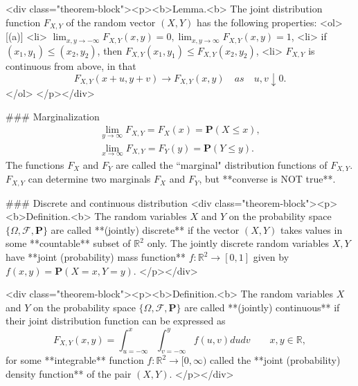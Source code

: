 <div class="theorem-block"><p><b>Lemma.<b> 
The joint distribution function $F_{X, Y}$ of the random vector $(X, Y)$ has the following properties: 
<ol>[(a)]
    <li> $\lim_{x, y\to -\infty} F_{X, Y}(x, y) = 0, \lim_{x,y\to\infty} F_{X, Y}(x,y) = 1$,
    <li> if $(x_1, y_1) \leq (x_2, y_2)$, then $F_{X,Y}(x_1, y_1) \leq F_{X, Y}(x_2, y_2)$,
    <li> $F_{X,Y}$ is continuous from above, in that 
    $$\begin{equation}
        F_{X,Y}(x+u, y+v) \to F_{X,Y}(x,y) \quad as \quad u, v \downarrow 0.
    \end{equation}$$
</ol>
</p></div>

### Marginalization 
\begin{gather*}
    \lim_{y\to\infty} F_{X,Y} = F_X(x) = \mathbf{P}(X \leq x), \\
    \lim_{x\to\infty} F_{X,Y} = F_Y(y) = \mathbf{P}(Y \leq y).
\end{gather*}
The functions $F_X$ and $F_Y$ are called the ``marginal" distribution functions of $F_{X,Y}$. $F_{X,Y}$ can determine two marginals $F_X$ and $F_Y$, but **converse is NOT true**.

### Discrete and continuous distribution
<div class="theorem-block"><p><b>Definition.<b> 
The random variables $X$ and $Y$ on the probability space $\{ \Omega, \mathcal{F}, \mathbf{P} \}$ are called **(jointly) discrete** if the vector $(X, Y)$ takes values in some **countable** subset of $\mathbb{R}^2$ only. The jointly discrete random variables $X, Y$ have **joint (probability) mass function** $f : \mathbb{R}^2 \to [0,1]$ given by $f(x, y) = \mathbf{P}(X = x, Y = y)$. 
</p></div>

<div class="theorem-block"><p><b>Definition.<b> 
The random variables $X$ and $Y$ on the probability space $\{ \Omega, \mathcal{F}, \mathbf{P} \}$ are called **(jointly) continuous** if their joint distribution function can be expressed as 
$$\begin{equation}
    F_{X,Y}(x,y) = \int_{u = -\infty}^x \int_{v = -\infty}^y f(u,v)du dv \qquad x, y\in\mathbb{R},
\end{equation}$$
for some **integrable** function $f : \mathbb{R}^2 \to [0, \infty)$ called the **joint (probability) density function** of the pair $(X, Y)$. 
</p></div>

